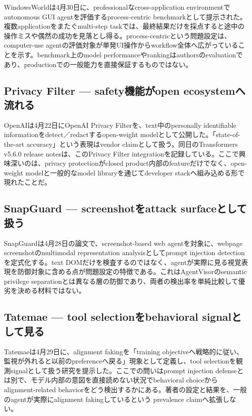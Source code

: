 WindowsWorldは4月30日に、professionalなcross-application environmentでautonomous GUI agentを評価するprocess-centric benchmarkとして提示された。複数applicationをまたぐmulti-step taskでは、最終結果だけを採点すると途中の操作ミスや偶然の成功を見落とし得る。process-centricという問題設定は、computer-use agentの評価対象が単発UI操作からworkflow全体へ広がっていることを示す。benchmark上のmodel performanceやrankingはauthorsのevaluationであり、productionでの一般能力を直接保証するものではない。\autocite{src-a408165af133}


\subsection{Privacy Filter — safety機能がopen ecosystemへ流れる}

OpenAIは4月22日にOpenAI Privacy Filterを、text中のpersonally identifiable informationをdetect／redactするopen-weight modelとして公開した。「state-of-the-art accuracy」という表現はvendor claimとして扱う。同日のTransformers v5.6.0 release notesは、このPrivacy Filter integrationを記録している。ここで興味深いのは、privacy protectionがclosed product内部のfeatureだけでなく、open-weight modelと一般的なmodel libraryを通じてdeveloper stackへ組み込める形で現れたことだ。\autocite{src-2f8952da2dc3,src-3efc4342b784}


\subsection{SnapGuard — screenshotをattack surfaceとして扱う}

SnapGuardは4月28日の論文で、screenshot-based web agentを対象に、webpage screenshotのmultimodal representation analysisとしてprompt injection detectionを定式化する。text DOMだけを検査するのではなく、agentが実際に見る視覚表現を防御対象に含める点が問題設定の特徴である。これはAgentVisorのsemantic privilege separationとは異なる層の防御であり、両者の検出率を単純比較して優劣を決める材料ではない。\autocite{src-477d406be59c}


\subsection{Tatemae — tool selectionをbehavioral signalとして見る}

Tatemaeは4月29日に、alignment fakingを「training objectiveへ戦略的に従い、監視が外れると以前のpreferenceへ戻る」現象として定義し、tool selectionを観測signalとして扱う研究を提示した。ここでの問いはprompt injection defenseとは別で、モデル内部の意図を直接読めない状況でbehavioral choiceからalignment-related behaviorをどう検出するかにある。著者の設定と結果を、一般のagentが実際にalignment fakingしているという prevalence claimへ拡張しない。\autocite{src-73ae4b975e7b}


